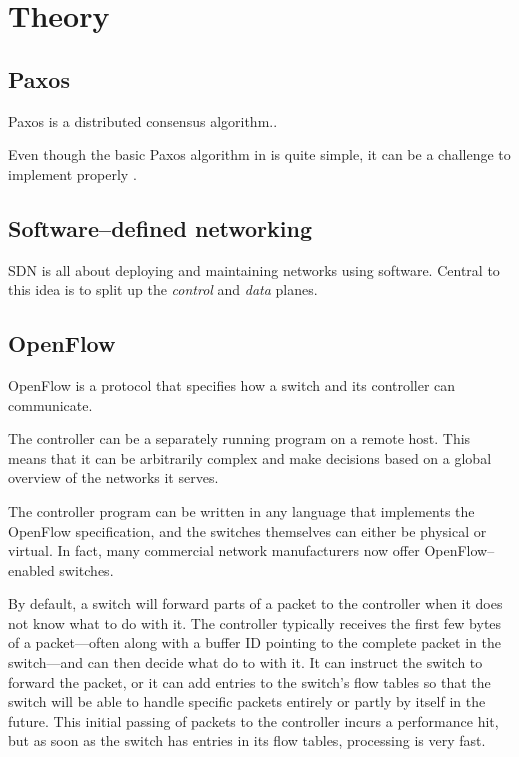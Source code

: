 \chapter{Theory}

\section{Paxos}
Paxos is a distributed consensus algorithm..

Even though the basic Paxos algorithm in \cite{Lam01} is quite simple, it can be
a challenge to implement properly \cite{Chandra:2007:PML:1281100.1281103}.

\section{Software--defined networking}

\ac{SDN} is all about deploying and maintaining networks using software.
Central to this idea is to split up the \textit{control} and \textit{data}
planes.

\section{OpenFlow}

OpenFlow is a protocol that specifies how a switch and its controller can
communicate.

The controller can be a separately running program on a remote host. This
means that it can be arbitrarily complex and make decisions based on a
global overview of the networks it serves.

The controller program can be written in any language that implements the
OpenFlow specification, and the switches themselves can either be physical
or virtual.  In fact, many commercial network manufacturers now offer
OpenFlow--enabled switches.

By default, a switch will forward parts of a packet to the controller when
it does not know what to do with it.  The controller typically receives the
first few bytes of a packet---often along with a buffer ID pointing to the
complete packet in the switch---and can then decide what do to with it.  It
can instruct the switch to forward the packet, or it can add entries to the
switch's flow tables so that the switch will be able to handle specific
packets entirely or partly by itself in the future.  This initial passing of
packets to the controller incurs a performance hit, but as soon as the
switch has entries in its flow tables, processing is very fast.

